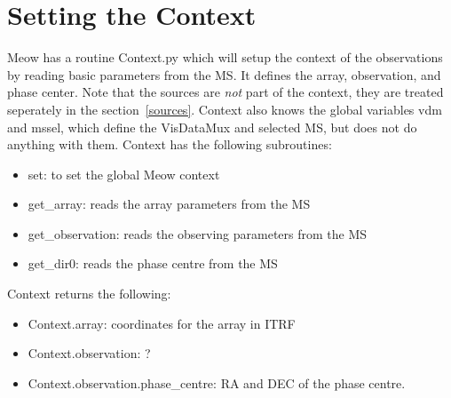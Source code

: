 \documentclass[11pt]{article}
\begin{document}
\section{Setting the Context}\label{context}
Meow has a routine Context.py which will setup the context of the observations by reading basic parameters from the MS. It defines the array, observation, and phase center. Note that the sources are {\em not} part of the context, they are treated seperately in the section~\ref{sources}. Context also knows the global variables vdm and mssel, which define the VisDataMux and selected MS, but does not do anything with them. Context has the following subroutines:
\begin{itemize}
\item set: to set the global Meow context
\item get\_array: reads the array parameters from the MS
\item get\_observation: reads the observing parameters from the MS
\item get\_dir0: reads the phase centre from the MS
\end{itemize}

Context returns the following:
\begin{itemize}
\item Context.array: coordinates for the array in ITRF
\item Context.observation: ?
\item Context.observation.phase\_centre: RA and DEC of the phase centre.
\end{itemize}
\end{document}
